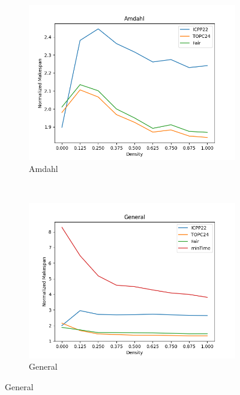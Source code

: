 \documentclass{article}
\begin{document}
\begin{figure}[htbp]
\begin{subfigure}[b]{0.32\textwidth}\includegraphics[width=\textwidth]{Results/Density/Density_Amdahl}\caption{Amdahl}\label{fig:lines_figures_Density_Amdahl}\end{subfigure}
\\[2ex]
\begin{subfigure}[b]{0.32\textwidth}\includegraphics[width=\textwidth]{Results/Density/Density_General}\caption{General}\label{fig:lines_figures_Density_General}\end{subfigure}
\hfill

\end{figure}
\end{document}

